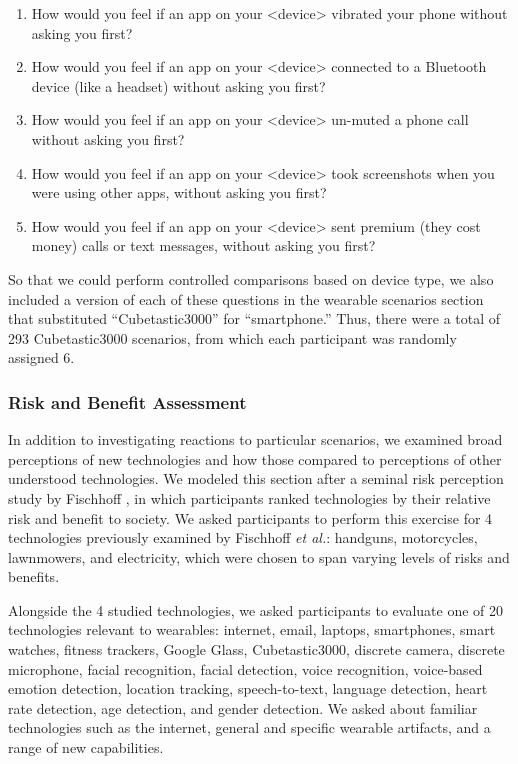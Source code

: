 \begin{enumerate}[topsep=0pt,itemsep=-1ex,partopsep=1ex,parsep=1ex]
\item How would you feel if an app on your <device> vibrated your phone without asking you first?
\item How would you feel if an app on your <device> connected to a Bluetooth device (like a headset) without asking you first?
\item How would you feel if an app on your <device> un-muted a phone call without asking you first?
\item How would you feel if an app on your <device> took screenshots when you were using other apps, without asking you first?
\item How would you feel if an app on your <device> sent premium (they cost money) calls or text messages, without asking you first?
\end{enumerate}

So that we could perform controlled comparisons based on device type, we also included a version of each of these questions in the wearable scenarios section that substituted ``Cubetastic3000'' for ``smartphone.'' Thus, there were a total of 293 Cubetastic3000 scenarios, from which each participant was randomly assigned 6.

\subsubsection{Risk and Benefit Assessment}
In addition to investigating reactions to particular scenarios, we examined broad perceptions of new technologies and how those compared to perceptions of other understood technologies. We modeled this section after a seminal risk perception study by Fischhoff \etal\cite{Fischhoff}, in which participants ranked technologies by their relative risk and benefit to society. We asked participants to perform this exercise for 4 technologies previously examined by Fischhoff {\it et al.}: handguns, motorcycles, lawnmowers, and electricity, which were chosen to span varying levels of risks and benefits.

Alongside the 4 studied technologies, we asked participants to evaluate one of 20 technologies relevant to wearables: internet, email, laptops, smartphones, smart watches, fitness trackers, Google Glass, Cubetastic3000, discrete camera, discrete microphone, facial recognition, facial detection, voice recognition, voice-based emotion detection, location tracking, speech-to-text, language detection, heart rate detection, age detection, and gender detection. We asked about familiar technologies such as the internet, general and specific wearable artifacts, and a range of new capabilities. 

